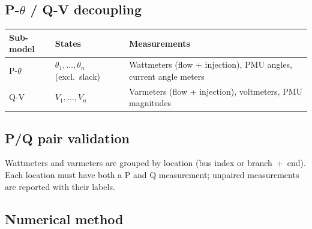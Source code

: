 \documentclass[11pt,a4paper]{article}
\begin{document}
\subsection{P-$\theta$ / Q-V decoupling}

\begin{center}
\small
\begin{tabular}{llp{50mm}}
  \toprule
  \textbf{Sub-model} & \textbf{States} & \textbf{Measurements} \\
  \midrule
  P-$\theta$ & $\theta_1, \ldots, \theta_n$ (excl.\ slack)
    & Wattmeters (flow + injection), PMU angles,
      current angle meters \\
  Q-V & $V_1, \ldots, V_n$
    & Varmeters (flow + injection), voltmeters,
      PMU magnitudes \\
  \bottomrule
\end{tabular}
\end{center}

\subsection{P/Q pair validation}

Wattmeters and varmeters are grouped by location (bus index or
branch~+~end).  Each location must have both a P and Q measurement; unpaired
measurements are reported with their labels.

\subsection{Numerical method}\label{sec:obs-num}
\end{document}
